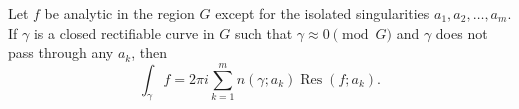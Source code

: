 Let $f$ be analytic in the region $G$ except for the isolated singularities $a_1, a_2, \ldots, a_m$. If $\gamma$ is a closed rectifiable curve in $G$ such that $\gamma \approx 0 \pmod{G}$ and $\gamma$ does not pass through any $a_k$, then
$$\int_{\gamma} f = 2\pi i \sum_{k=1}^{m} n(\gamma; a_k) \operatorname{Res}(f; a_k).$$
